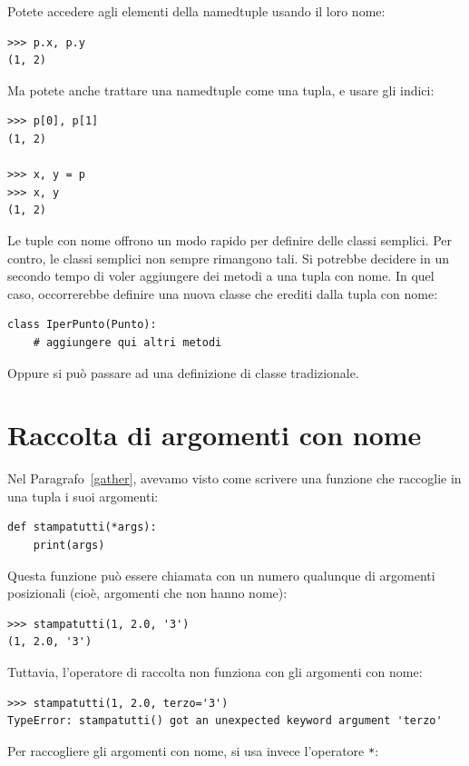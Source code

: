 \documentclass[10pt]{book}
\begin{document}
Potete accedere agli elementi della namedtuple usando il loro nome:

\begin{verbatim}
>>> p.x, p.y
(1, 2)
\end{verbatim}

Ma potete anche trattare una namedtuple come una tupla, e usare gli indici:

\begin{verbatim}
>>> p[0], p[1]
(1, 2)

>>> x, y = p
>>> x, y
(1, 2)
\end{verbatim}

Le tuple con nome offrono un modo rapido per definire delle classi semplici.
Per contro, le classi semplici non sempre rimangono tali. Si potrebbe decidere in un secondo tempo di voler aggiungere dei metodi a una tupla con nome. In quel caso, occorrerebbe definire una nuova classe che erediti dalla tupla con nome:

\begin{verbatim}
class IperPunto(Punto):
    # aggiungere qui altri metodi
\end{verbatim}

Oppure si può passare ad una definizione di classe tradizionale.


\section{Raccolta di argomenti con nome}

Nel Paragrafo~\ref{gather}, avevamo visto come scrivere una funzione che raccoglie in una tupla i suoi argomenti:

\begin{verbatim}
def stampatutti(*args):
    print(args)
\end{verbatim}
%
Questa funzione può essere chiamata con un numero qualunque di argomenti posizionali (cioè, argomenti che non hanno nome):

\begin{verbatim}
>>> stampatutti(1, 2.0, '3')
(1, 2.0, '3')
\end{verbatim}
%
Tuttavia, l'operatore di raccolta {\tt *} non funziona con gli argomenti con nome:

\begin{verbatim}
>>> stampatutti(1, 2.0, terzo='3')
TypeError: stampatutti() got an unexpected keyword argument 'terzo'
\end{verbatim}
%
Per raccogliere gli argomenti con nome, si usa invece l'operatore {\tt **}:
\end{document}
